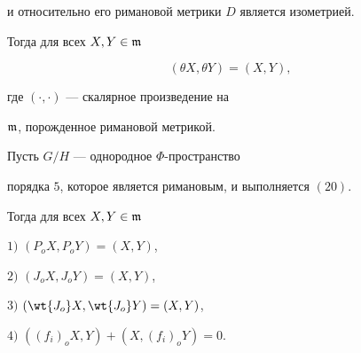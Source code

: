 и относительно его римановой метрики $D$ является изометрией.


Тогда для всех $X,Y \in \frak{m}$


\begin{equation}\label{20}


(\theta X,\theta Y)=(X,Y),


\end{equation}


где $(\cdot,\cdot)$ --- скалярное произведение на


$\frak{m}$, порожденное римановой метрикой.





\begin{thm}


Пусть $G/H$ --- однородное $\Phi$-пространство


порядка $5$, которое является римановым, и выполняется $(20)$.


Тогда для всех $X,Y \in \frak{m}$





$1)$ $(P_oX,P_oY)=(X,Y)$,





$2)$ $(J_oX,J_oY)=(X,Y)$,





$3)$ $(\wt{J_o}X,\wt{J_o}Y)=(X,Y)$,





$4)$ $((f_i)_oX,Y)+(X,(f_i)_oY)=0$.


\end{thm}





